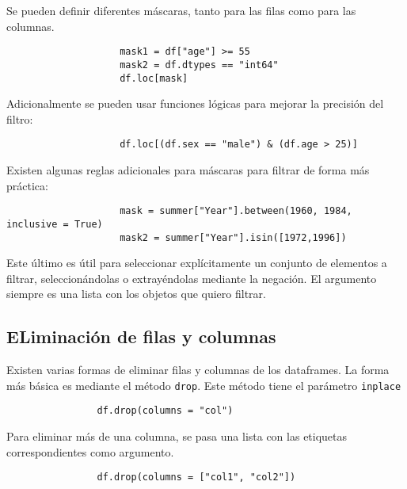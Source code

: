                 Se pueden definir diferentes máscaras, tanto para las filas como para las columnas.

                \begin{verbatim}
                    mask1 = df["age"] >= 55
                    mask2 = df.dtypes == "int64"
                    df.loc[mask]    
                \end{verbatim}

                Adicionalmente se pueden usar funciones lógicas para mejorar la precisión del filtro:
                \begin{verbatim}
                    df.loc[(df.sex == "male") & (df.age > 25)]    
                \end{verbatim}

                Existen algunas reglas adicionales para máscaras para filtrar de forma más práctica:

                \begin{verbatim}
                    mask = summer["Year"].between(1960, 1984, inclusive = True)
                    mask2 = summer["Year"].isin([1972,1996])
                \end{verbatim}

                Este último es útil para seleccionar explícitamente un conjunto de elementos a filtrar, seleccionándolas o extrayéndolas mediante la negación. El argumento siempre es una lista con los objetos que quiero filtrar.

        \subsection{ELiminación de filas y columnas}

            Existen varias formas de eliminar filas y columnas de los dataframes. La forma más básica es mediante el método \texttt{drop}. Este método tiene el parámetro \texttt{inplace}

            \begin{verbatim}
                df.drop(columns = "col")    
            \end{verbatim}

            Para eliminar más de una columna, se pasa una lista con las etiquetas correspondientes como argumento.


            \begin{verbatim}
                df.drop(columns = ["col1", "col2"])    
            \end{verbatim}

